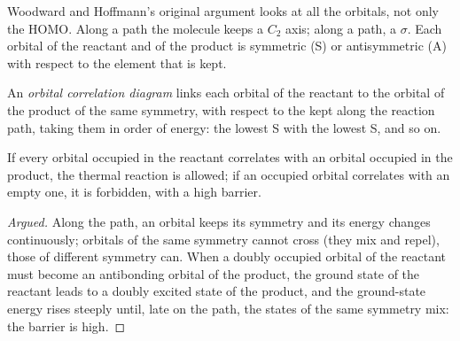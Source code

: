 Woodward and Hoffmann's original argument looks at all the orbitals, not only
the HOMO. Along a  path the molecule keeps a $C_2$ axis; along a
 path, a  $\sigma$. Each orbital of the reactant and of the
product is symmetric (S) or antisymmetric (A) with respect to the element that
is kept.

\begin{definition}\label{def:b3:pericyclic:orbital-correlation}
An \emph{orbital correlation diagram} links
each orbital of the reactant to the orbital of the product of the same symmetry,
with respect to the  kept along the reaction path, taking them
in order of energy: the lowest S with the lowest S, and so on.
\end{definition}

\begin{proposition}\label{prop:b3:pericyclic:correlation}
If every orbital occupied in the reactant correlates with an orbital occupied in
the product, the thermal reaction is allowed; if an occupied orbital correlates
with an empty one, it is forbidden, with a high barrier.
\end{proposition}

\begin{proof}[Argued]
Along the path, an orbital keeps its symmetry and its energy changes
continuously; orbitals of the same symmetry cannot cross (they mix and repel),
those of different symmetry can. When a doubly occupied orbital of the reactant
must become an antibonding orbital of the product, the ground state of the
reactant leads to a doubly excited state of the product, and the ground-state
energy rises steeply until, late on the path, the states of the same symmetry
mix: the barrier is high.
\end{proof}


